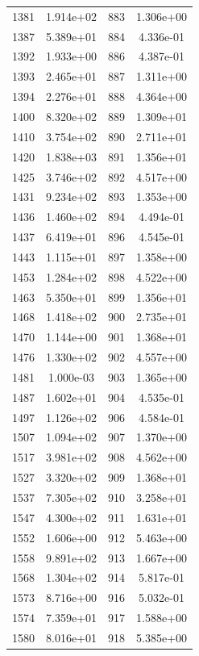 \documentclass[12pt]{article}
\begin{document}
\begin{longtable}{@{}cccc@{}}
1381 & 1.914e+02 & 883 & 1.306e+00 \\
1387 & 5.389e+01 & 884 & 4.336e-01 \\
1392 & 1.933e+00 & 886 & 4.387e-01 \\
1393 & 2.465e+01 & 887 & 1.311e+00 \\
1394 & 2.276e+01 & 888 & 4.364e+00 \\
1400 & 8.320e+02 & 889 & 1.309e+01 \\
1410 & 3.754e+02 & 890 & 2.711e+01 \\
1420 & 1.838e+03 & 891 & 1.356e+01 \\
1425 & 3.746e+02 & 892 & 4.517e+00 \\
1431 & 9.234e+02 & 893 & 1.353e+00 \\
1436 & 1.460e+02 & 894 & 4.494e-01 \\
1437 & 6.419e+01 & 896 & 4.545e-01 \\
1443 & 1.115e+01 & 897 & 1.358e+00 \\
1453 & 1.284e+02 & 898 & 4.522e+00 \\
1463 & 5.350e+01 & 899 & 1.356e+01 \\
1468 & 1.418e+02 & 900 & 2.735e+01 \\
1470 & 1.144e+00 & 901 & 1.368e+01 \\
1476 & 1.330e+02 & 902 & 4.557e+00 \\
1481 & 1.000e-03 & 903 & 1.365e+00 \\
1487 & 1.602e+01 & 904 & 4.535e-01 \\
1497 & 1.126e+02 & 906 & 4.584e-01 \\
1507 & 1.094e+02 & 907 & 1.370e+00 \\
1517 & 3.981e+02 & 908 & 4.562e+00 \\
1527 & 3.320e+02 & 909 & 1.368e+01 \\
1537 & 7.305e+02 & 910 & 3.258e+01 \\
1547 & 4.300e+02 & 911 & 1.631e+01 \\
1552 & 1.606e+00 & 912 & 5.463e+00 \\
1558 & 9.891e+02 & 913 & 1.667e+00 \\
1568 & 1.304e+02 & 914 & 5.817e-01 \\
1573 & 8.716e+00 & 916 & 5.032e-01 \\
1574 & 7.359e+01 & 917 & 1.588e+00 \\
1580 & 8.016e+01 & 918 & 5.385e+00 \\

\bottomrule
\end{longtable}
\end{document}
